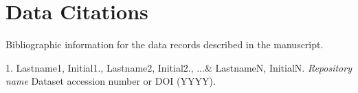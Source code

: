 \documentclass[english]{article}
\begin{document}
\section*{Data Citations}

Bibliographic information for the data records described in the manuscript.

1. Lastname1, Initial1., Lastname2, Initial2., ...\& LastnameN, InitialN. \emph{Repository name} Dataset accession number or DOI (YYYY).
\end{document}
